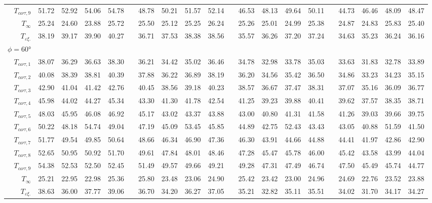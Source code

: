 \begin{landscape}
\begin{table*}
\begin{adjustbox}{width=1.4\textheight, center = \textheight}
\begin{tabular}{@{}rrrrrcrrrrcrrrrcrrrr@{}}
$\scriptstyle{T_{αντ, 9}}$ & 51.72 & 52.92 & 54.06 & 54.78 && 48.78 & 50.21 & 51.57 & 52.14 && 46.53 & 48.13 & 49.64 & 50.11 && 44.73 & 46.46 & 48.09 & 48.47\\ 
$\scriptstyle{T_{\infty}}$ & 25.24 & 24.60 & 23.88 & 25.72 && 25.50 & 25.12 & 25.25 & 26.24 && 25.26 & 25.01 & 24.99 & 25.38 && 24.87 & 24.83 & 25.83 & 25.40\\ 
$\scriptstyle{T_{εξ.}}$ & 38.19 & 39.17 & 39.90 & 40.27 && 36.71 & 37.53 & 38.38 & 38.56 && 35.57 & 36.26 & 37.20 & 37.24 && 34.63 & 35.23 & 36.24 & 36.16\\
$\phi=\ang{60}$\\
$\scriptstyle{T_{αντ, 1}}$ & 38.07 & 36.29 & 36.63 & 38.30 && 36.21 & 34.42 & 35.02 & 36.46 && 34.78 & 32.98 & 33.78 & 35.03 && 33.63 & 31.83 & 32.78 & 33.89\\ 
$\scriptstyle{T_{αντ, 2}}$ & 40.08 & 38.39 & 38.81 & 40.39 && 37.88 & 36.22 & 36.89 & 38.19 && 36.20 & 34.56 & 35.42 & 36.50 && 34.86 & 33.23 & 34.23 & 35.15\\ 
$\scriptstyle{T_{αντ, 3}}$ & 42.90 & 41.04 & 41.42 & 42.76 && 40.45 & 38.56 & 39.18 & 40.23 && 38.57 & 36.67 & 37.47 & 38.31 && 37.07 & 35.16 & 36.09 & 36.77\\ 
$\scriptstyle{T_{αντ, 4}}$ & 45.98 & 44.02 & 44.27 & 45.34 && 43.30 & 41.30 & 41.78 & 42.54 && 41.25 & 39.23 & 39.88 & 40.41 && 39.62 & 37.57 & 38.35 & 38.71\\ 
$\scriptstyle{T_{αντ, 5}}$ & 48.03 & 45.95 & 46.08 & 46.92 && 45.17 & 43.02 & 43.37 & 43.88 && 43.00 & 40.80 & 41.31 & 41.58 && 41.26 & 39.03 & 39.66 & 39.75\\ 
$\scriptstyle{T_{αντ, 6}}$ & 50.22 & 48.18 & 54.74 & 49.04 && 47.19 & 45.09 & 53.45 & 45.85 && 44.89 & 42.75 & 52.43 & 43.43 && 43.05 & 40.88 & 51.59 & 41.50\\ 
$\scriptstyle{T_{αντ, 7}}$ & 51.77 & 49.54 & 49.85 & 50.64 && 48.66 & 46.34 & 46.90 & 47.36 && 46.30 & 43.91 & 44.66 & 44.88 && 44.41 & 41.97 & 42.86 & 42.90\\ 
$\scriptstyle{T_{αντ, 8}}$ & 52.65 & 50.95 & 50.92 & 51.70 && 49.61 & 47.84 & 48.01 & 48.46 && 47.28 & 45.47 & 45.78 & 46.00 && 45.42 & 43.58 & 43.99 & 44.04\\ 
$\scriptstyle{T_{αντ, 9}}$ & 54.38 & 52.53 & 52.50 & 52.45 && 51.49 & 49.57 & 49.66 & 49.21 && 49.28 & 47.31 & 47.49 & 46.74 && 47.50 & 45.49 & 45.74 & 44.77\\ 
$\scriptstyle{T_{\infty}}$ & 25.21 & 22.95 & 22.98 & 25.36 && 25.80 & 23.48 & 23.06 & 24.90 && 25.42 & 23.42 & 23.00 & 24.96 && 24.69 & 22.76 & 23.52 & 23.88\\ 
$\scriptstyle{T_{εξ.}}$ & 38.63 & 36.00 & 37.77 & 39.06 && 36.70 & 34.20 & 36.27 & 37.05 && 35.21 & 32.82 & 35.11 & 35.51 && 34.02 & 31.70 & 34.17 & 34.27\\
\bottomrule
\end{tabular}
\end{adjustbox}
\end{table*}



\end{landscape}
